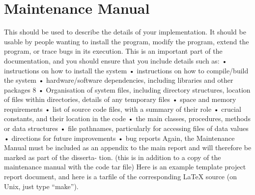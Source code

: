 \chapter{Maintenance Manual}

This should be used to describe the details of your implementation. It should be usable by people wanting to install the program, modify the program, extend the program, or trace bugs in its execution. This is an important part of the documentation, and you should ensure that you include details such as:
• instructions on how to install the system
• instructions on how to compile/build the system
• hardware/software dependencies, including libraries and other packages
8
• Organisation of system files, including directory structures, location of files within directories, details of any temporary files
• space and memory requirements
• list of source code files, with a summary of their role
• crucial constants, and their location in the code
• the main classes, procedures, methods or data structures
• file pathnames, particularly for accessing files of data values • directions for future improvements
• bug reports
Again, the Maintenance Manual must be included as an appendix to the main report and will therefore be marked as part of the disserta- tion. (this is in addition to a copy of the maintenance manual with the code tar file)
Here is an example template project report document, and here is a tarfile of the corresponding LaTeX source (on Unix, just type “make”).